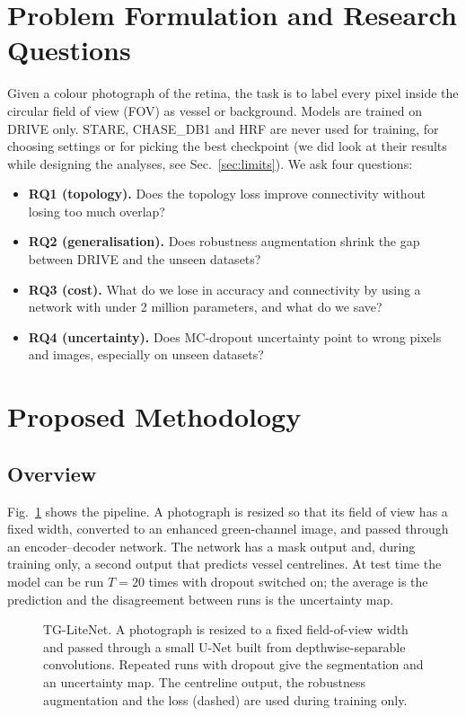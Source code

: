 \documentclass[conference]{IEEEtran}
\begin{document}
\section{Problem Formulation and Research Questions}
Given a colour photograph of the retina, the task is to label every pixel inside the circular field of view (FOV) as vessel or background. Models are trained on DRIVE only. STARE, CHASE\_DB1 and HRF are never used for training, for choosing settings or for picking the best checkpoint (we did look at their results while designing the analyses, see Sec.~\ref{sec:limits}). We ask four questions:
\begin{itemize}
\item \textbf{RQ1 (topology).} Does the topology loss improve connectivity without losing too much overlap?
\item \textbf{RQ2 (generalisation).} Does robustness augmentation shrink the gap between DRIVE and the unseen datasets?
\item \textbf{RQ3 (cost).} What do we lose in accuracy and connectivity by using a network with under 2 million parameters, and what do we save?
\item \textbf{RQ4 (uncertainty).} Does MC-dropout uncertainty point to wrong pixels and images, especially on unseen datasets?
\end{itemize}

\section{Proposed Methodology}
\subsection{Overview}
Fig.~\ref{fig:pipeline} shows the pipeline. A photograph is resized so that its field of view has a fixed width, converted to an enhanced green-channel image, and passed through an encoder--decoder network. The network has a mask output and, during training only, a second output that predicts vessel centrelines. At test time the model can be run $T{=}20$ times with dropout switched on; the average is the prediction and the disagreement between runs is the uncertainty map.

\begin{figure}[t]
\centering
\resizebox{0.97\textwidth}{!}{}
\caption{TG-LiteNet. A photograph is resized to a fixed field-of-view width and passed through a small U-Net built from depthwise-separable convolutions. Repeated runs with dropout give the segmentation and an uncertainty map. The centreline output, the robustness augmentation and the loss (dashed) are used during training only.}
\label{fig:pipeline}
\end{figure}
\end{document}

